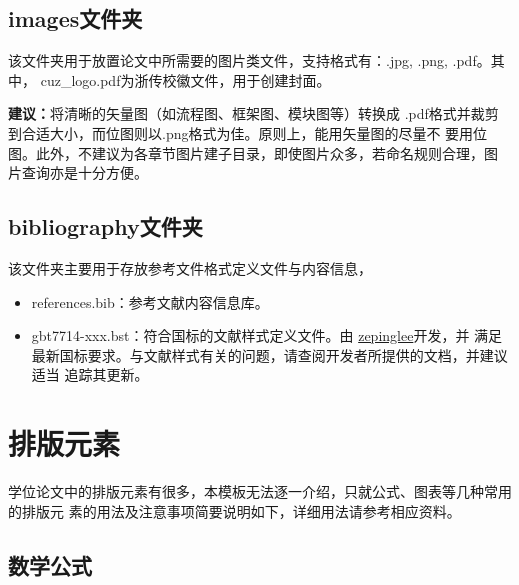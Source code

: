 \subsection{images文件夹}\label{sub:images-folder}

该文件夹用于放置论文中所需要的图片类文件，支持格式有：.jpg, .png, .pdf。其中，
cuz{\_}logo.pdf为浙传校徽文件，用于创建封面。


\begin{leftbar}
    \noindent\textbf{建议：}将清晰的矢量图（如流程图、框架图、模块图等）转换成
    .pdf格式并裁剪到合适大小，而位图则以.png格式为佳。原则上，能用矢量图的尽量不
    要用位图。此外，不建议为各章节图片建子目录，即使图片众多，若命名规则合理，图
    片查询亦是十分方便。
\end{leftbar}

\subsection{bibliography文件夹}\label{sub:bibliography}

该文件夹主要用于存放参考文件格式定义文件与内容信息，

\begin{itemize}
    \item references.bib：参考文献内容信息库。
    \item gbt7714-xxx.bst：符合国标的文献样式定义文件。由
    \href{https://github.com/zepinglee/gbt7714-bibtex-style}{zepinglee}开发，并
    满足最新国标要求。与文献样式有关的问题，请查阅开发者所提供的文档，并建议适当
    追踪其更新。
\end{itemize}

\section{排版元素}\label{sec:elements}

学位论文中的排版元素有很多，本模板无法逐一介绍，只就公式、图表等几种常用的排版元
素的用法及注意事项简要说明如下，详细用法请参考相应资料。

\subsection{数学公式}\label{sub:equations}

